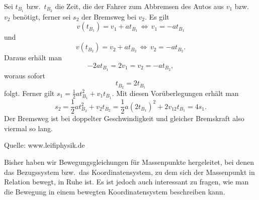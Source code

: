 \begin{MExercises}
\begin{MExercise}
     
     \begin{MSolution}
     Sei $t_{B_1}$ bzw.~$t_{B_2}$ die Zeit, die der Fahrer zum Abbremsen des Autos aus $v_1$ bzw.~$v_2$ ben\"otigt, ferner sei $s_2$ der Bremsweg bei $v_2$. Es gilt 
     $$
     v(t_{B_1})=v_1+at_{B_1}\,\Leftrightarrow\, v_1=-at_{B_1}
     $$ und
     $$
     v(t_{B_2})=v_2+at_{B_2}\,\Leftrightarrow\, v_2=-at_{B_2}.
     $$
     Daraus erh\"alt man
     $$
     -2at_{B_1}=2v_1=v_2=-at_{B_2},
     $$woraus sofort 
     $$
     t_{B_2}=2t_{B_1}
     $$folgt. Ferner gilt $s_1=\frac{1}{2}at_{B_1}^2+v_1t_{B_1}$. Mit diesen Vor\"uberlegungen erh\"alt man
     $$
     s_2=\frac{1}{2}at_{B_2}^2+v_2t_{B_2}=\frac{1}{2}a(2t_{B_1})^2+2v_12t_{B_1}=4s_1.
     $$Der Bremsweg ist bei doppelter Geschwindigkeit und gleicher Bremskraft also viermal so lang.\\
     \end{MSolution}
     
     Quelle: www.leifiphysik.de
     \end{MExercise}
     
     
     \end{MExercises}

          
          

     \begin{MIntro}
     Bisher haben wir Bewegungsgleichungen f\"ur Massenpunkte hergeleitet, bei denen das Bezugssystem bzw.~das Koordinatensystem, zu dem sich der Massenpunkt in Relation bewegt, in Ruhe ist. Es ist jedoch auch interessant zu fragen, wie man die Bewegung in einem bewegten Koordinatensystem beschreiben kann. 
     \end{MIntro}
   
